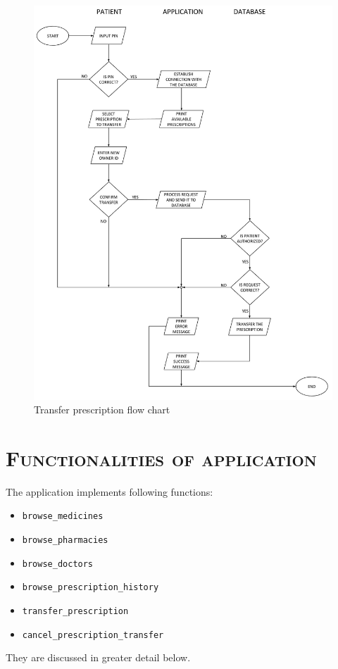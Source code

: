 \documentclass[12pt,titlepage]{article}
\begin{document}
\begin{figure}
\includegraphics[width=\linewidth]{transferPrescriptionFlowChart}
\caption{Transfer prescription flow chart}
\end{figure}


\newpage


\section{\textsc{Functionalities of application}}

The application implements following functions:
\begin{itemize}
\item \texttt{browse\_medicines}
\item \texttt{browse\_pharmacies}
\item \texttt{browse\_doctors}
\item \texttt{browse\_prescription\_history}
\item \texttt{transfer\_prescription}
\item \texttt{cancel\_prescription\_transfer}
\end{itemize}
They are discussed in greater detail below.
\end{document}
